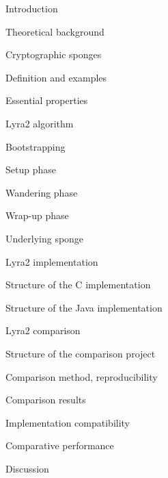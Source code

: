 \documentclass[a4paper,10pt,english]{INSOexpose}
\begin{document}
\begin{samepage}
  \begin{contentstructure}
  \item Introduction 
  \item Theoretical background 
    \begin{contentstructure}
    \item Cryptographic sponges 
      \begin{contentstructure}
      \item Definition and examples 
      \item Essential properties 
      \end{contentstructure}
    \item Lyra2 algorithm 
      \begin{contentstructure}
      \item{Bootstrapping} 
      \item{Setup phase} 
      \item{Wandering phase} 
      \item{Wrap-up phase} 
      \item{Underlying sponge} 
        \end{contentstructure}
    \end{contentstructure}
  \item Lyra2 implementation 
    \begin{contentstructure}
    \item Structure of the C implementation 
    \item Structure of the Java implementation 
    \end{contentstructure}
  \item Lyra2 comparison 
    \begin{contentstructure}
    \item Structure of the comparison project 
    \item Comparison method, reproducibility 
    \item Comparison results 
      \begin{contentstructure}
      \item Implementation compatibility 
      \item Comparative performance 
      \end{contentstructure}
    \end{contentstructure}
  \item Discussion 
  \end{contentstructure}
\end{samepage}


\printbibliography
\end{document}
